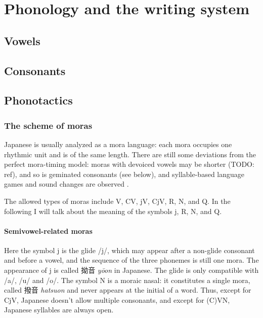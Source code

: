 \documentclass[UTF8, a4paper, oneside, scheme=plain]{ctexrep}
\newcommand*{\citesec}[1]{\S~{#1}}
\newcommand{\corpus}[1]{\emph{#1}}
\begin{document}
\chapter{Phonology and the writing system}

\section{Vowels}\label{sec:vowel}

\section{Consonants}\label{sec:consonant}

\section{Phonotactics}

\subsection{The scheme of moras}\label{sec:mora-scheme}

Japanese is usually analyzed as a mora language:
each mora occupies one rhythmic unit and is of the same length.
There are still some deviations from the perfect mora-timing model:
moras with devoiced vowels may be shorter (TODO: ref),
and so is geminated consonants (see below),
and syllable-based language games and sound changes are observed 
\citep[\citesec{3.3}]{tsujimura2013introduction}.

The allowed types of moras include V, CV, jV, CjV, R, N, and Q.
In the following I will talk about the meaning of the symbols j, R, N, and Q. 

\subsubsection{Semivowel-related moras}

Here the symbol j is the glide /j/,
which may appear after a non-glide consonant and before a vowel,
and the sequence of the three phonemes is still one mora.
The appearance of j is called 拗音 \corpus{yōon} in Japanese.
The glide is only compatible with /a/, /u/ and /o/.
The symbol N is a moraic nasal:
it constitutes a single mora, called 撥音 \corpus{hatsuon} 
and never appears at the initial of a word.
Thus, except for CjV, Japanese doesn't allow multiple consonants,
and except for (C)VN, Japanese syllables are always open.
\end{document}
